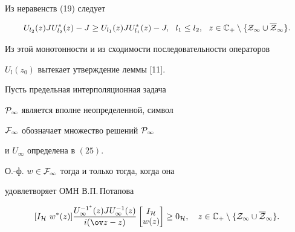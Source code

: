 \begin{pf}


Из неравенств (19) следует


$$


U_{l_2}(z)J U_{l_2}^*(z)-J \geq U_{l_1}(z)J U_{l_1}^*(z)-J,\ \


l_1\leq l_2,\ \ z\in {\Bbb C}_+\setminus


\{{\cal Z}_{\infty }\cup \overline {\cal Z}_{\infty }\}.


$$


Из этой монотонности и из сходимости последовательности операторов


$U_{l}(z_0)$ вытекает утверждение леммы [11].


\end{pf}





\begin{thm}


Пусть предельная интерполяционная задача


${\cal P}_{\infty }$ является вполне неопределенной, символ


${\cal F}_{\infty }$ обозначает множество решений ${\cal P}_{\infty }$


и $U_{\infty }$ определена в $(25)$.





О.-ф. $w\in {\cal F}_{\infty }$ тогда и только тогда, когда она


удовлетворяет ОМН В.П.\,Потапова


\begin{equation}


[I_{\cal H}\ w^*(z) ] \frac {U_{\infty }^{-1^*}(z)J


U_{\infty }^{-1}(z)}{i(\ov z-z)}


\begin{bmatrix} I_{\cal H} \\ w(z) \end{bmatrix}


\geq 0_{\cal H},\quad z\in {\Bbb C}_{+} \setminus


\{{\cal Z}_{\infty } \cup \overline {\cal Z}_{\infty } \}.


\end{equation}


\end{thm}





